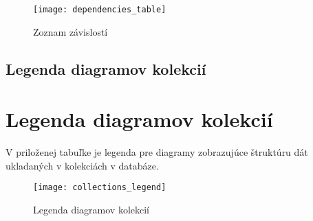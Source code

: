\begin{figure}[H]
	\begin{center}\texttt{[image: dependencies\_table]}\end{center}
	\caption[Zoznam závislotí]{Zoznam závislostí}\label{fig:dependencies_table}
\end{figure}

\newpage
{}
{
	\section{Legenda diagramov kolekcií}
}
{
	\chapter{Legenda diagramov kolekcií}
}
V priloženej tabuľke je legenda pre diagramy zobrazujúce štruktúru dát ukladaných v kolekciách v databáze.

\begin{figure}[H]
	\begin{center}\texttt{[image: collections\_legend]}\end{center}
	\caption[Legenda diagramov kolekcií]{Legenda diagramov kolekcií}\label{fig:collections_legend}
\end{figure}

